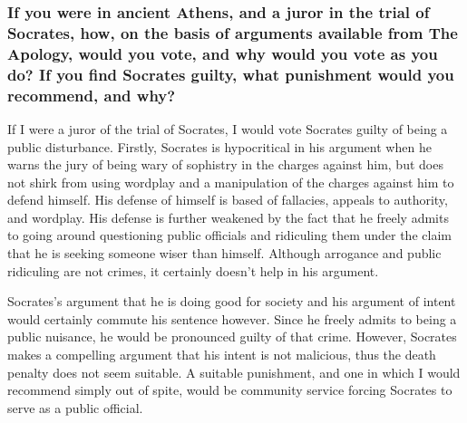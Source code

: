 \documentclass[letterpaper, 12pt]{article}
\begin{document}
\subsubsection*{If you were in ancient Athens, and a juror in the trial of
Socrates, how, on the basis of arguments available from The Apology, would you
vote, and why would you vote as you do? If you find Socrates guilty, what
punishment would you recommend, and why?}
If I were a juror of the trial of Socrates, I would vote Socrates guilty of being a public disturbance. Firstly, Socrates is hypocritical in his argument when he warns the jury of being wary of sophistry in the charges against him, but does not shirk from using wordplay and a manipulation of the charges against him to defend himself. His defense of himself is based of fallacies, appeals to authority, and wordplay. His defense is further weakened by the fact that he freely admits to going around questioning public officials and ridiculing them under the claim that he is seeking someone wiser than himself. Although arrogance and public ridiculing are not crimes, it certainly doesn't help in his argument. \par
Socrates's argument that he is doing good for society and his argument of intent would certainly commute his sentence however. Since he freely admits to being a public nuisance, he would be pronounced guilty of that crime. However, Socrates makes a compelling argument that his intent is not malicious, thus the death penalty does not seem suitable. A suitable punishment, and one in which I would recommend simply out of spite, would be community service forcing Socrates to serve as a public official.
\end{document}
